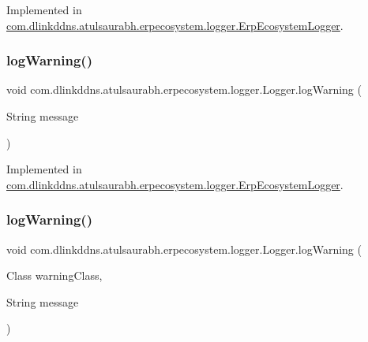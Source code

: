Implemented in \mbox{\hyperlink{classcom_1_1dlinkddns_1_1atulsaurabh_1_1erpecosystem_1_1logger_1_1_erp_ecosystem_logger_ad6718b3031cb8032127659aeac49d803}{com.\+dlinkddns.\+atulsaurabh.\+erpecosystem.\+logger.\+Erp\+Ecosystem\+Logger}}.

\mbox{\label{interfacecom_1_1dlinkddns_1_1atulsaurabh_1_1erpecosystem_1_1logger_1_1_logger_aab8d04f52fde89ff5e58d84b40e25144}} 
\subsubsection{\texorpdfstring{log\+Warning()}{logWarning()}\hspace{0.1cm}{\footnotesize\ttfamily [1/3]}}
{\footnotesize\ttfamily void com.\+dlinkddns.\+atulsaurabh.\+erpecosystem.\+logger.\+Logger.\+log\+Warning (\begin{DoxyParamCaption}\item[{String}]{message }\end{DoxyParamCaption})}



Implemented in \mbox{\hyperlink{classcom_1_1dlinkddns_1_1atulsaurabh_1_1erpecosystem_1_1logger_1_1_erp_ecosystem_logger_a4a4c244511da1da97773a5a7933552d2}{com.\+dlinkddns.\+atulsaurabh.\+erpecosystem.\+logger.\+Erp\+Ecosystem\+Logger}}.

\mbox{\label{interfacecom_1_1dlinkddns_1_1atulsaurabh_1_1erpecosystem_1_1logger_1_1_logger_aa5df260afe6fcae92f5a9236b3b6a983}} 
\subsubsection{\texorpdfstring{log\+Warning()}{logWarning()}\hspace{0.1cm}{\footnotesize\ttfamily [2/3]}}
{\footnotesize\ttfamily void com.\+dlinkddns.\+atulsaurabh.\+erpecosystem.\+logger.\+Logger.\+log\+Warning (\begin{DoxyParamCaption}\item[{Class}]{warning\+Class,  }\item[{String}]{message }\end{DoxyParamCaption})}



